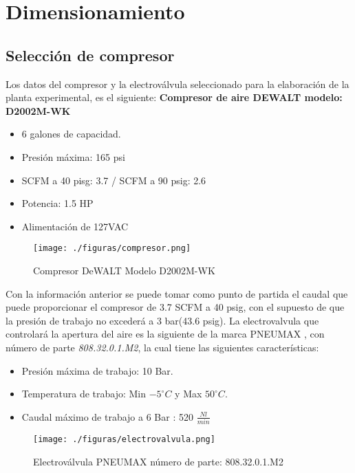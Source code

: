 \chapter{Dimensionamiento}

\section{Selección de compresor}
Los datos del compresor y la electrov\'alvula seleccionado para la elaboraci\'on de la planta experimental, es el siguiente:
\newline
\textbf{Compresor de aire DEWALT modelo: D2002M-WK}
\begin{itemize}
	\item 6 galones de capacidad.
	\item Presi\'on m\'axima: 165 psi
	\item SCFM a 40 pisg: 3.7 / SCFM a 90 psig: 2.6
	\item Potencia: 1.5 HP
	\item Alimentaci\'on de 127VAC
\end{itemize}
\begin{figure}[ht!]
	\centering
	\texttt{[image: ./figuras/compresor.png]}
	\caption{Compresor DeWALT Modelo D2002M-WK \texttrademark}
\end{figure}

Con la informaci\'on anterior se puede tomar como punto de partida el caudal que puede proporcionar el compresor de 3.7 SCFM a 40 psig, con el supuesto de que la presión de trabajo no exceder\'a a 3 bar(43.6 psig).
\newline
La electrovalvula que controlar\'a la apertura del aire es la siguiente de la marca PNEUMAX \texttrademark , con n\'umero de parte \textit {808.32.0.1.M2}, la cual tiene las siguientes características:
\begin{itemize}
	\item Presi\'on m\'axima de trabajo: 10 Bar.
	\item Temperatura de trabajo: Min $- 5^\circ C $ y Max $50^\circ C$.
	\item Caudal m\'aximo de trabajo a 6 Bar : 520 $\frac{Nl}{min}$
\end{itemize}
\begin{figure}[ht!]
	\centering
	\texttt{[image: ./figuras/electrovalvula.png]}
	\caption{Electrov\'alvula PNEUMAX \texttrademark n\'umero de parte: 808.32.0.1.M2 }
\end{figure}


